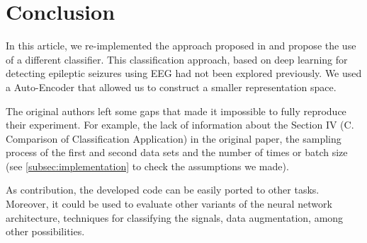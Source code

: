 \newpage

\section{Conclusion}\label{sec:concl}
In this article, we re-implemented the approach proposed in \cite{WenZha:2018} and propose the use of a different classifier. This classification approach, based on deep learning for detecting epileptic seizures using EEG had not been explored previously. We used a Auto-Encoder that allowed us to construct a smaller representation space.

The original authors left some gaps that made it impossible to fully reproduce their experiment. For example, the lack of information about the Section IV (C. Comparison of Classification Application) in the original paper, the sampling process of the first and second data sets and the number of times or batch size (see \ref{subsec:implementation} to check the assumptions we made).

As contribution, the developed code can be easily ported to other tasks. Moreover, it could be used to evaluate other variants of the neural network architecture, techniques for classifying the signals, data augmentation, among other possibilities.  



